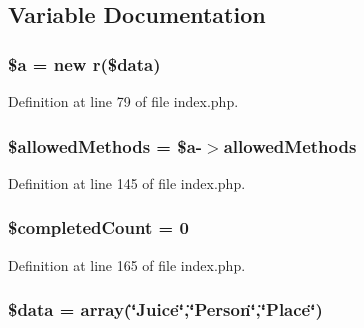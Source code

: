 \subsection{Variable Documentation}
\hypertarget{index_8php_acebf83966ef6d7e5645a6b62ba368f9f}{
\subsubsection[{\$a}]{\setlength{\rightskip}{0pt plus 5cm}\$a = new {\bf r}(\$data)}}\label{index_8php_acebf83966ef6d7e5645a6b62ba368f9f}


Definition at line 79 of file index.\-php.

\hypertarget{index_8php_ab278eba7cab5341dacdccecd7a2cc2df}{
\subsubsection[{\$allowed\-Methods}]{\setlength{\rightskip}{0pt plus 5cm}\$allowed\-Methods = \$a-\/$>$allowed\-Methods}}\label{index_8php_ab278eba7cab5341dacdccecd7a2cc2df}


Definition at line 145 of file index.\-php.

\hypertarget{index_8php_a51c734a41c7747051953ec3d78dd1c5b}{
\subsubsection[{\$completed\-Count}]{\setlength{\rightskip}{0pt plus 5cm}\$completed\-Count = 0}}\label{index_8php_a51c734a41c7747051953ec3d78dd1c5b}


Definition at line 165 of file index.\-php.

\hypertarget{index_8php_a6efc15b5a2314dd4b5aaa556a375c6d6}{
\subsubsection[{\$data}]{\setlength{\rightskip}{0pt plus 5cm}\$data = array(\char`\"{}Juice\char`\"{},\char`\"{}Person\char`\"{},\char`\"{}Place\char`\"{})}}\label{index_8php_a6efc15b5a2314dd4b5aaa556a375c6d6}


